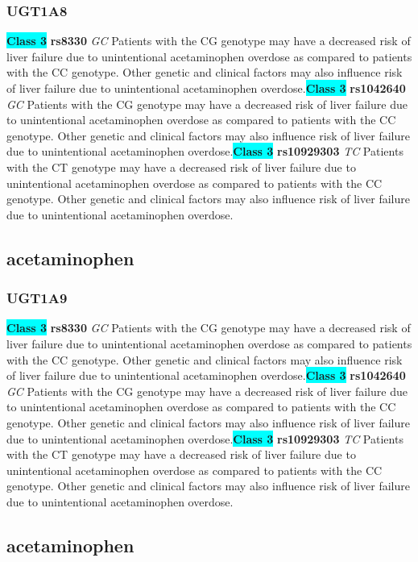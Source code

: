 \documentclass{book}
\begin{document}
\subsubsection{ UGT1A8 }

\begin{center}
\textbf{\colorbox{cyan} {Class 3}} \textbf{ rs8330 } \textit{ GC }
Patients with the CG genotype may have a decreased risk of liver failure due to unintentional acetaminophen overdose as compared to patients with the CC genotype. Other genetic and clinical factors may also influence risk of liver failure due to unintentional acetaminophen overdose.\textbf{\colorbox{cyan} {Class 3}} \textbf{ rs1042640 } \textit{ GC }
Patients with the CG genotype may have a decreased risk of liver failure due to unintentional acetaminophen overdose as compared to patients with the CC genotype. Other genetic and clinical factors may also influence risk of liver failure due to unintentional acetaminophen overdose.\textbf{\colorbox{cyan} {Class 3}} \textbf{ rs10929303 } \textit{ TC }
Patients with the CT genotype may have a decreased risk of liver failure due to unintentional acetaminophen overdose as compared to patients with the CC genotype. Other genetic and clinical factors may also influence risk of liver failure due to unintentional acetaminophen overdose.


\end{center}\subsection{ acetaminophen }


\subsubsection{ UGT1A9 }

\begin{center}
\textbf{\colorbox{cyan} {Class 3}} \textbf{ rs8330 } \textit{ GC }
Patients with the CG genotype may have a decreased risk of liver failure due to unintentional acetaminophen overdose as compared to patients with the CC genotype. Other genetic and clinical factors may also influence risk of liver failure due to unintentional acetaminophen overdose.\textbf{\colorbox{cyan} {Class 3}} \textbf{ rs1042640 } \textit{ GC }
Patients with the CG genotype may have a decreased risk of liver failure due to unintentional acetaminophen overdose as compared to patients with the CC genotype. Other genetic and clinical factors may also influence risk of liver failure due to unintentional acetaminophen overdose.\textbf{\colorbox{cyan} {Class 3}} \textbf{ rs10929303 } \textit{ TC }
Patients with the CT genotype may have a decreased risk of liver failure due to unintentional acetaminophen overdose as compared to patients with the CC genotype. Other genetic and clinical factors may also influence risk of liver failure due to unintentional acetaminophen overdose.


\end{center}\subsection{ acetaminophen }
\end{document}
